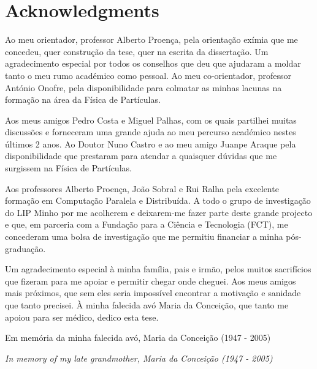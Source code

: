 \chapter*{Acknowledgments}

Ao meu orientador, professor Alberto Proença, pela orientação exímia que me concedeu, quer construção da tese, quer na escrita da dissertação. Um agradecimento especial por todos os conselhos que deu que ajudaram a moldar tanto o meu rumo académico como pessoal. Ao meu co-orientador, professor António Onofre, pela disponibilidade para colmatar as minhas lacunas na formação na área da Física de Partículas.

Aos meus amigos Pedro Costa e Miguel Palhas, com os quais partilhei muitas discussões e forneceram uma grande ajuda ao meu percurso académico nestes últimos 2 anos. Ao Doutor Nuno Castro e ao meu amigo Juanpe Araque pela disponibilidade que prestaram para atendar a quaisquer dúvidas que me surgissem na Física de Partículas.

Aos professores Alberto Proença, João Sobral e Rui Ralha pela excelente formação em Computação Paralela e Distribuída. A todo o grupo de investigação do LIP Minho por me acolherem e deixarem-me fazer parte deste grande projecto e que, em parceria com a Fundação para a Ciência e Tecnologia (FCT), me concederam uma bolsa de investigação que me permitiu financiar a minha pós-graduação.

Um agradecimento especial à minha família, pais e irmão, pelos muitos sacrifícios que fizeram para me apoiar e permitir chegar onde cheguei. Aos meus amigos mais próximos, que sem eles seria impossível encontrar a motivação e sanidade que tanto precisei. À minha falecida avó Maria da Conceição, que tanto me apoiou para ser médico, dedico esta tese.

\newpage

\vspace*{\fill}
\begin{center}
Em memória da minha falecida avó, Maria da Conceição (1947 - 2005)

\textit{In memory of my late grandmother, Maria da Conceição (1947 - 2005)}
\end{center}
\vspace*{\fill}
